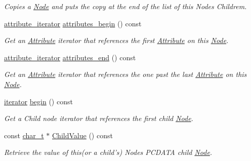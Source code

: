 \begin{DoxyCompactItemize}
\begin{DoxyCompactList}\small\item\em Copies a \hyperlink{classMezzanine_1_1xml_1_1Node}{Node} and puts the copy at the end of the list of this Nodes Childrem. \item\end{DoxyCompactList}\item 
\hyperlink{classMezzanine_1_1xml_1_1AttributeIterator}{attribute\_\-iterator} \hyperlink{classMezzanine_1_1xml_1_1Node_ac2b0aacde495d94e623d6ae6112a4a77}{attributes\_\-begin} () const 
\begin{DoxyCompactList}\small\item\em Get an \hyperlink{classMezzanine_1_1xml_1_1Attribute}{Attribute} iterator that references the first \hyperlink{classMezzanine_1_1xml_1_1Attribute}{Attribute} on this \hyperlink{classMezzanine_1_1xml_1_1Node}{Node}. \item\end{DoxyCompactList}\item 
\hyperlink{classMezzanine_1_1xml_1_1AttributeIterator}{attribute\_\-iterator} \hyperlink{classMezzanine_1_1xml_1_1Node_a7a8b4000d8b4a75deb0fd481121b0764}{attributes\_\-end} () const 
\begin{DoxyCompactList}\small\item\em Get an \hyperlink{classMezzanine_1_1xml_1_1Attribute}{Attribute} iterator that references the one past the last \hyperlink{classMezzanine_1_1xml_1_1Attribute}{Attribute} on this \hyperlink{classMezzanine_1_1xml_1_1Node}{Node}. \item\end{DoxyCompactList}\item 
\hyperlink{classMezzanine_1_1xml_1_1NodeIterator}{iterator} \hyperlink{classMezzanine_1_1xml_1_1Node_aeb8c1969bf9995a5718e9a4911738df5}{begin} () const 
\begin{DoxyCompactList}\small\item\em Get a Child node iterator that references the first child \hyperlink{classMezzanine_1_1xml_1_1Node}{Node}. \item\end{DoxyCompactList}\item 
const \hyperlink{namespaceMezzanine_1_1xml_a29b8a47c179e9895c4e9e66c45d1dbbc}{char\_\-t} $\ast$ \hyperlink{classMezzanine_1_1xml_1_1Node_a2c16f475e52ceb2ef66e50fbe97211bc}{ChildValue} () const 
\begin{DoxyCompactList}\small\item\em Retrieve the value of this(or a child's) Nodes PCDATA child \hyperlink{classMezzanine_1_1xml_1_1Node}{Node}. \item\end{DoxyCompactList}\item 

\end{DoxyCompactItemize}
